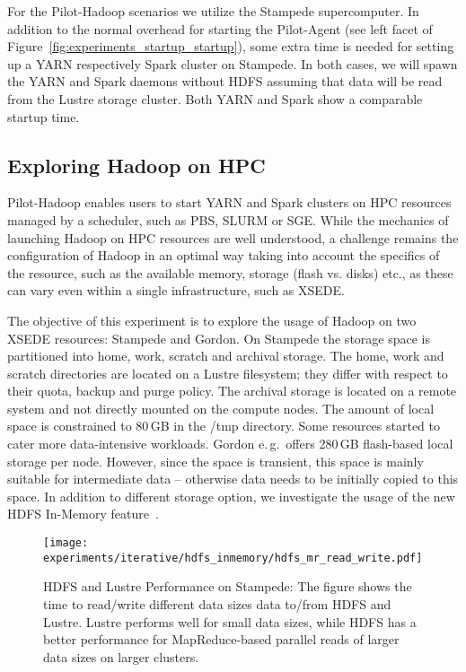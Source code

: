 \documentclass{sig-alternate}
\newcommand{\pilot}{Pilot\xspace}
\begin{document}
For the \pilot-Hadoop scenarios we utilize the Stampede supercomputer. In
addition to the normal overhead for starting the \pilot-Agent (see left facet
of Figure~\ref{fig:experiments_startup_startup}), some extra time is needed for
setting up a YARN respectively Spark cluster on Stampede. In both cases, we
will spawn the YARN and Spark daemons without HDFS assuming that data will be
read from the Lustre storage cluster. Both YARN and Spark show a comparable
startup time.


\subsection{Exploring Hadoop on HPC}

\pilot-Hadoop enables users to start YARN and Spark clusters on HPC resources
managed by a scheduler, such as PBS, SLURM or SGE. While the mechanics of
launching Hadoop on HPC resources are well understood, a challenge remains the
configuration of Hadoop in an optimal way taking into account the specifics of
the resource, such as the available memory, storage (flash vs. disks) etc., as 
these can vary even within a single infrastructure, such as XSEDE. 

The objective of this experiment is to explore the usage of Hadoop on two XSEDE
resources: Stampede and Gordon. On Stampede the storage space is partitioned
into home, work, scratch and archival storage. The home, work and scratch
directories are located on a Lustre filesystem; they differ with respect to
their quota, backup and purge policy. The archival storage is located on a
remote system and not directly mounted on the compute nodes. The amount of
local space is constrained to 80\,GB in the /tmp directory. Some resources
started to cater more data-intensive workloads. Gordon e.\,g.\ offers 280\,GB
flash-based local storage per node. However, since the space is transient, this
space is mainly suitable for intermediate data -- otherwise data needs to be
initially copied to this space. In addition to different storage option, we investigate the usage of the new HDFS In-Memory feature~\cite{hdfs-inmen}.


\begin{figure}[t]
    \centering
\texttt{[image: experiments/iterative/hdfs\_inmemory/hdfs\_mr\_read\_write.pdf]}
\caption{HDFS and Lustre Performance on Stampede: The figure shows the time to 
read/write different data sizes data to/from HDFS and Lustre. Lustre performs 
well for small data sizes, while HDFS has a better performance for 
MapReduce-based parallel reads of larger data sizes on larger clusters.}
    \label{fig:experiments_iterative_hdfs_inmemory_hdfs_mr_read_write}
\end{figure}
\end{document}
